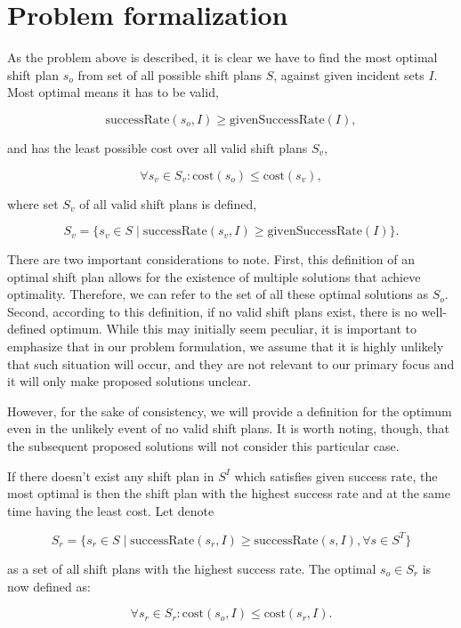 \section{Problem formalization}
As the problem above is described, it is clear we have to find the most optimal
shift plan $s_o$ from set of all possible shift plans $S$, against given
incident sets $I$. Most optimal means it has to be valid,

\[
    \text{successRate}(s_o, I) \geq
    \text{givenSuccessRate}(I),
\]

and has the least possible cost over all valid shift plans $S_v$,

\[
    \forall s_v \in S_v: \text{cost}(s_o) \leq \text{cost}(s_v),
\]

where set $S_v$ of all valid shift plans is defined,

\[
    S_v = \{ s_v \in S \mid \text{successRate}(s_v, I) \geq \text{givenSuccessRate}(I) \}.
\]

There are two important considerations to note. First, this definition of an
optimal shift plan allows for the existence of multiple solutions that achieve
optimality. Therefore, we can refer to the set of all these optimal solutions
as $S_o$. Second, according to this definition, if no valid shift plans exist,
there is no well-defined optimum. While this may initially seem peculiar, it is
important to emphasize that in our problem formulation, we assume that it is
highly unlikely that such situation will occur, and they are not relevant to
our primary focus and it will only make proposed solutions unclear.

However, for the sake of consistency, we will provide a definition for the
optimum even in the unlikely event of no valid shift plans. It is worth noting,
though, that the subsequent proposed solutions will not consider this
particular case.

If there doesn't exist any shift plan in $S^I$ which satisfies given success
rate, the most optimal is then the shift plan with the highest success rate and
at the same time having the least cost. Let denote

\[
    S_r = \{s_r \in S \mid \text{successRate}(s_r, I) \geq \text{successRate}(s, I), \forall s \in S^T\}
\]

as a set of all shift plans with the highest success rate. The optimal $s_o \in
    S_r$ is now defined as:

\[
    \forall s_r \in S_r: \text{cost}(s_o, I) \leq \text{cost}(s_r, I).
\]

